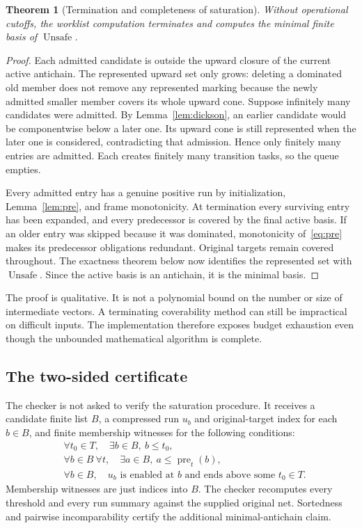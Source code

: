 \documentclass[11pt,a4paper]{article}
\newcommand{\pre}{\operatorname{pre}}
\newcommand{\Unsafe}{\operatorname{Unsafe}}
\newtheorem{theorem}{Theorem}[section]
\theoremstyle{definition}
\theoremstyle{remark}
\begin{document}
\begin{theorem}[Termination and completeness of saturation]\label{thm:saturation}
Without operational cutoffs, the worklist computation terminates and computes the minimal finite basis of $\Unsafe$.
\end{theorem}
\begin{proof}
Each admitted candidate is outside the upward closure of the current active antichain. The represented upward set only grows: deleting a dominated old member does not remove any represented marking because the newly admitted smaller member covers its whole upward cone. Suppose infinitely many candidates were admitted. By Lemma~\ref{lem:dickson}, an earlier candidate would be componentwise below a later one. Its upward cone is still represented when the later one is considered, contradicting that admission. Hence only finitely many entries are admitted. Each creates finitely many transition tasks, so the queue empties.

Every admitted entry has a genuine positive run by initialization, Lemma~\ref{lem:pre}, and frame monotonicity. At termination every surviving entry has been expanded, and every predecessor is covered by the final active basis. If an older entry was skipped because it was dominated, monotonicity of~\eqref{eq:pre} makes its predecessor obligations redundant. Original targets remain covered throughout. The exactness theorem below now identifies the represented set with $\Unsafe$. Since the active basis is an antichain, it is the minimal basis.
\end{proof}

The proof is qualitative. It is not a polynomial bound on the number or size of intermediate vectors. A terminating coverability method can still be impractical on difficult inputs. The implementation therefore exposes budget exhaustion even though the unbounded mathematical algorithm is complete.

\subsection{The two-sided certificate}\label{sec:twosided}
The checker is not asked to verify the saturation procedure. It receives a candidate finite list $B$, a compressed run $u_b$ and original-target index for each $b\in B$, and finite membership witnesses for the following conditions:
\begin{align}
 &\forall t_0\in T,\quad \exists b\in B,\ b\le t_0,\label{eq:cert-target}\\
 &\forall b\in B\ \forall t,\quad \exists a\in B,\ a\le\pre_t(b),\label{eq:cert-closure}\\
 &\forall b\in B,\quad u_b\text{ is enabled at }b
   \text{ and ends above some }t_0\in T.\label{eq:cert-positive}
\end{align}
Membership witnesses are just indices into $B$. The checker recomputes every threshold and every run summary against the supplied original net. Sortedness and pairwise incomparability certify the additional minimal-antichain claim.
\end{document}
